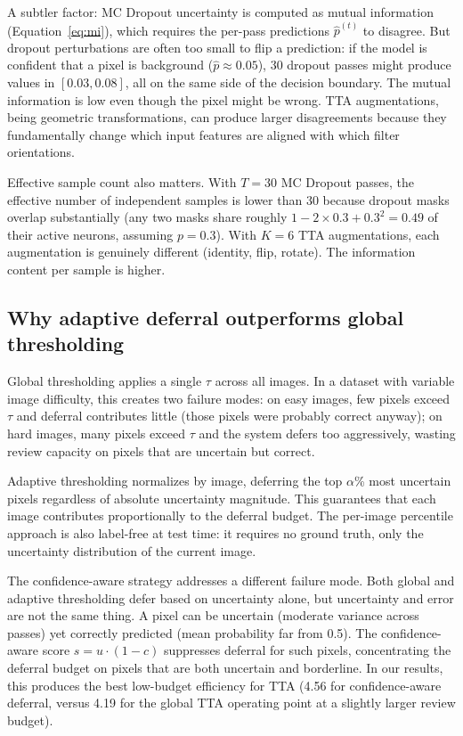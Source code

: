 A subtler factor: MC Dropout uncertainty is computed
as mutual information (Equation~\ref{eq:mi}), which requires the
per-pass predictions $\hat{p}^{(t)}$ to disagree. But dropout perturbations
are often too small to flip a prediction: if the model is confident that
a pixel is background ($\hat{p} \approx 0.05$), 30 dropout passes might
produce values in $[0.03, 0.08]$, all on the same side of the decision
boundary. The mutual information is low even though the pixel might be
wrong. TTA augmentations, being geometric transformations, can produce
larger disagreements because they fundamentally change which input features
are aligned with which filter orientations.

Effective sample count also matters. With $T = 30$ MC Dropout
passes, the effective number of independent samples is lower than 30
because dropout masks overlap substantially (any two masks share roughly
$1 - 2 \times 0.3 + 0.3^2 = 0.49$ of their active neurons, assuming
$p = 0.3$). With $K = 6$ TTA augmentations, each augmentation is
genuinely different (identity, flip, rotate). The information content
per sample is higher.

\subsection{Why adaptive deferral outperforms global thresholding}

Global thresholding applies a single $\tau$ across all images. In a dataset
with variable image difficulty, this creates two failure modes: on easy
images, few pixels exceed $\tau$ and deferral contributes little (those
pixels were probably correct anyway); on hard images, many pixels exceed
$\tau$ and the system defers too aggressively, wasting review capacity on
pixels that are uncertain but correct.

Adaptive thresholding normalizes by image, deferring the top $\alpha$\%
most uncertain pixels regardless of absolute uncertainty magnitude. This
guarantees that each image contributes proportionally to the deferral
budget. The per-image percentile approach is also label-free at test time:
it requires no ground truth, only the uncertainty distribution of the
current image.

The confidence-aware strategy addresses a different failure mode. Both
global and adaptive thresholding defer based on uncertainty alone, but
uncertainty and error are not the same thing. A pixel can be uncertain
(moderate variance across passes) yet correctly predicted (mean probability
far from 0.5). The confidence-aware score $s = u \cdot (1 - c)$ suppresses
deferral for such pixels, concentrating the deferral budget on pixels
that are both uncertain and borderline. In our results, this produces
the best low-budget efficiency for TTA (4.56 for confidence-aware deferral,
versus 4.19 for the global TTA operating point at a slightly larger review
budget).

